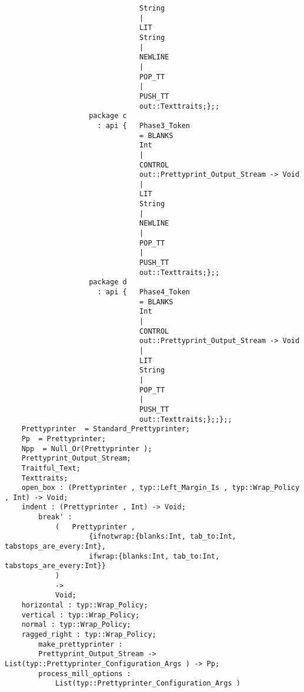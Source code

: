 \begin{verbatim}
                                String
                                |
                                LIT
                                String
                                |
                                NEWLINE
                                |
                                POP_TT
                                |
                                PUSH_TT
                                out::Texttraits;};;
                    package c
                      : api {   Phase3_Token
                                = BLANKS
                                Int
                                |
                                CONTROL
                                out::Prettyprint_Output_Stream -> Void
                                |
                                LIT
                                String
                                |
                                NEWLINE
                                |
                                POP_TT
                                |
                                PUSH_TT
                                out::Texttraits;};;
                    package d
                      : api {   Phase4_Token
                                = BLANKS
                                Int
                                |
                                CONTROL
                                out::Prettyprint_Output_Stream -> Void
                                |
                                LIT
                                String
                                |
                                POP_TT
                                |
                                PUSH_TT
                                out::Texttraits;};;};;
    Prettyprinter  = Standard_Prettyprinter;
    Pp  = Prettyprinter;
    Npp  = Null_Or(Prettyprinter );
    Prettyprint_Output_Stream;
    Traitful_Text;
    Texttraits;
    open_box : (Prettyprinter , typ::Left_Margin_Is , typ::Wrap_Policy , Int) -> Void;
    indent : (Prettyprinter , Int) -> Void;
        break' :
            (   Prettyprinter ,
                    {ifnotwrap:{blanks:Int, tab_to:Int, tabstops_are_every:Int},
                    ifwrap:{blanks:Int, tab_to:Int, tabstops_are_every:Int}}
            )
            ->
            Void;
    horizontal : typ::Wrap_Policy;
    vertical : typ::Wrap_Policy;
    normal : typ::Wrap_Policy;
    ragged_right : typ::Wrap_Policy;
        make_prettyprinter :
        Prettyprint_Output_Stream -> List(typ::Prettyprinter_Configuration_Args ) -> Pp;
        process_mill_options :
            List(typ::Prettyprinter_Configuration_Args )

\end{verbatim}
